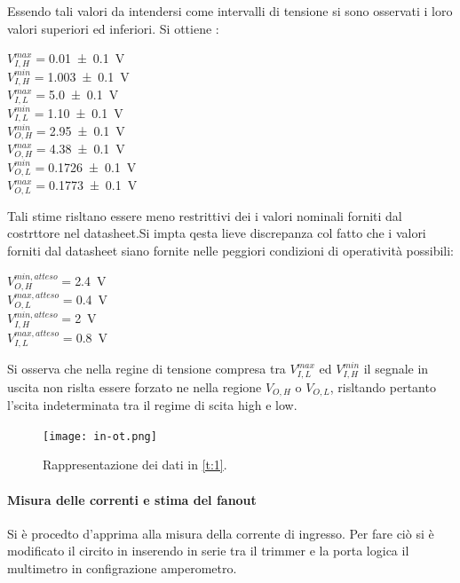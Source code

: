 	 Essendo tali valori da intendersi come intervalli di tensione si sono osservati i loro valori superiori ed inferiori.
	 Si ottiene :
	 \begin{center}
	 $V_{I,H}^{max}=$\SI{0.01 \pm 0.1}{\volt} \\
	 $V_{I,H}^{min}=$\SI{1.003 \pm 0.1}{\volt}\\
	 $V_{I,L}^{max}=$\SI{5.0 \pm 0.1}{\volt}\\
	 $V_{I,L}^{min}=$\SI{1.10 \pm 0.1}{\volt}\\

	 $V_{O,H}^{min}=$\SI{2.95 \pm 0.1}{\volt}\\
	 $V_{O,H}^{max}=$\SI{4.38 \pm 0.1}{\volt}\\
	 $V_{O,L}^{min}=$\SI{0.1726 \pm 0.1}{\volt}\\
	 $V_{O,L}^{max}=$\SI{0.1773 \pm 0.1}{\volt}	\\
	 \end{center}

	 Tali stime risltano essere meno restrittivi dei i valori
	 nominali forniti dal costrttore nel datasheet.Si impta qesta lieve discrepanza
	 col fatto che i valori forniti dal datasheet siano fornite nelle peggiori condizioni di operatività possibili:
	 \begin{center}

	 	$V_{O,H}^{min,atteso}=$\SI{2.4}{\volt}\\
	 	$V_{O,L}^{max,atteso}=$\SI{0.4}{\volt}\\
	 $V_{I,H}^{min,atteso}=$\SI{2}{\volt}\\
	 $V_{I,L}^{max,atteso}=$\SI{0.8}{\volt}\\
 \end{center}
	 Si osserva che nella regine di tensione compresa tra 	$V_{I,L}^{max}$ ed $V_{I,H}^{min}$ il segnale in uscita non rislta essere forzato ne nella regione $V_{O,H}$ o $V_{O,L}$, risltando pertanto  l'scita indeterminata tra il regime di scita high e low.
	\begin{figure}[h]
		\centering
		\texttt{[image: in-ot.png]}
		\caption{Rappresentazione dei dati in \tablename{ \ref{t:1}}.}
		\label{f:i1}
	\end{figure}


\paragraph{Misura delle correnti e stima del fanout}
	Si è procedto d'apprima alla misura della corrente di ingresso.
	Per fare ciò si è modificato il circito in  inserendo in serie tra il trimmer e la porta logica il multimetro in configrazione amperometro.


